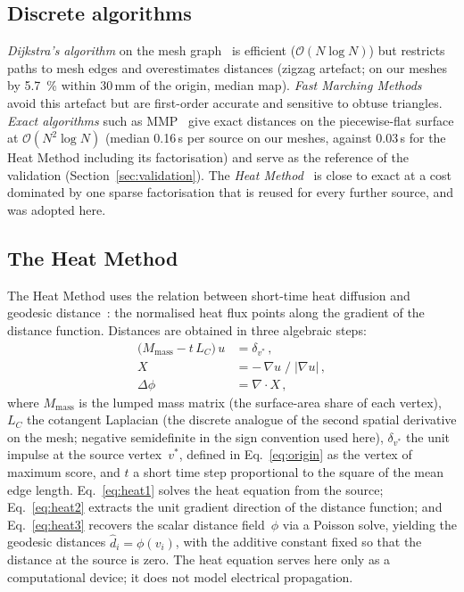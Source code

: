 \documentclass[a4paper,fleqn]{cas-dc}
\begin{document}
\subsection{Discrete algorithms}\label{sec:discrete_geo}

\emph{Dijkstra's algorithm} on the mesh graph~\citep{dijkstra1959} is
efficient ($\mathcal{O}(N\log N)$) but restricts paths to mesh edges and
overestimates distances (zigzag artefact; on our meshes by
\SI{5.7}{\percent} within 30\,mm of the origin, median map).
\emph{Fast Marching Methods}~\citep{kimmel1998} avoid this artefact but
are first-order accurate and sensitive to obtuse triangles.
\emph{Exact algorithms} such as MMP~\citep{mitchell1987, surazhsky2005}
give exact distances on the piecewise-flat surface at
$\mathcal{O}(N^2 \log N)$ (median 0.16\,s per source on our meshes,
against 0.03\,s for the Heat Method including its factorisation) and
serve as the reference of the validation (Section~\ref{sec:validation}).
The \emph{Heat Method}~\citep{crane2017} is close to exact at a cost
dominated by one sparse factorisation that is reused for every further
source, and was adopted here.

\subsection{The Heat Method}\label{sec:heat_method}

The Heat Method uses the relation between short-time heat diffusion
and geodesic distance~\citep{varadhan1967}: the normalised heat flux
points along the gradient of the distance function.  Distances are
obtained in three algebraic steps:
\begin{align}
  \bigl(M_{\mathrm{mass}} - t\,L_C\bigr)\,u &= \delta_{v^*}\,,
    \label{eq:heat1} \\[3pt]
  X &= -\,\nabla u \;/\; |\nabla u|\,,
    \label{eq:heat2} \\[3pt]
  \Delta\phi &= \nabla \cdot X\,,
    \label{eq:heat3}
\end{align}
where $M_{\mathrm{mass}}$ is the lumped mass matrix (the surface-area
share of each vertex), $L_C$ the cotangent Laplacian (the discrete
analogue of the second spatial derivative on the mesh; negative
semidefinite in the sign convention used here), $\delta_{v^*}$ the unit
impulse at the source vertex~$v^*$, defined in Eq.~\eqref{eq:origin} as
the vertex of maximum score, and $t$ a short time step proportional to
the square of the mean edge length.  Eq.~\eqref{eq:heat1} solves the heat
equation from the source; Eq.~\eqref{eq:heat2} extracts the unit
gradient direction of the distance function; and Eq.~\eqref{eq:heat3}
recovers the scalar distance field~$\phi$ via a Poisson solve, yielding
the geodesic distances $\hat{d}_i = \phi(v_i)$, with the additive
constant fixed so that the distance at the source is zero.  The heat
equation serves here only as a computational device; it does not model
electrical propagation.
\end{document}
